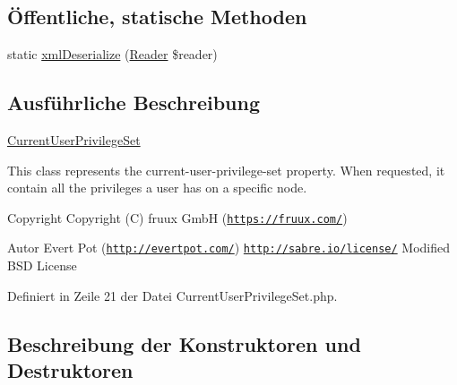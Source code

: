 \subsection*{Öffentliche, statische Methoden}
\begin{DoxyCompactItemize}
\item 
static \mbox{\hyperlink{class_sabre_1_1_d_a_v_a_c_l_1_1_xml_1_1_property_1_1_current_user_privilege_set_a91512d74a26e294a1aafa50f122291b3}{xml\+Deserialize}} (\mbox{\hyperlink{class_sabre_1_1_xml_1_1_reader}{Reader}} \$reader)
\end{DoxyCompactItemize}


\subsection{Ausführliche Beschreibung}
\mbox{\hyperlink{class_sabre_1_1_d_a_v_a_c_l_1_1_xml_1_1_property_1_1_current_user_privilege_set}{Current\+User\+Privilege\+Set}}

This class represents the current-\/user-\/privilege-\/set property. When requested, it contain all the privileges a user has on a specific node.

\begin{DoxyCopyright}{Copyright}
Copyright (C) fruux GmbH (\href{https://fruux.com/}{\tt https\+://fruux.\+com/}) 
\end{DoxyCopyright}
\begin{DoxyAuthor}{Autor}
Evert Pot (\href{http://evertpot.com/}{\tt http\+://evertpot.\+com/})  \href{http://sabre.io/license/}{\tt http\+://sabre.\+io/license/} Modified B\+SD License 
\end{DoxyAuthor}


Definiert in Zeile 21 der Datei Current\+User\+Privilege\+Set.\+php.



\subsection{Beschreibung der Konstruktoren und Destruktoren}
\mbox{\label{class_sabre_1_1_d_a_v_a_c_l_1_1_xml_1_1_property_1_1_current_user_privilege_set_a05a7d8d5105854e9b9845842eae1ddba}} 
